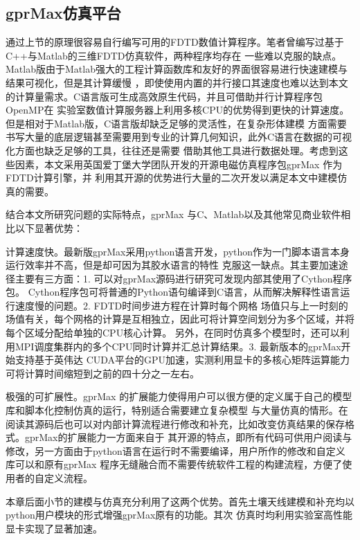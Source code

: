 \subsection{gprMax仿真平台}
通过上节的原理很容易自行编写可用的FDTD数值计算程序。笔者曾编写过基于C++与Matlab的三维FDTD仿真软件，两种程序均存在
一些难以克服的缺点。Matlab版由于Matlab强大的工程计算函数库和友好的界面很容易进行快速建模与结果可视化，但是其计算缓慢
，即使使用内置的并行接口其速度也难以达到本文的计算量需求。C语言版可生成高效原生代码，并且可借助并行计算程序包OpenMP在
实验室数值计算服务器上利用多核CPU的优势得到更快的计算速度。但是相对于Matlab版，C语言版却缺乏足够的灵活性，在复杂形体建模
方面需要书写大量的底层逻辑甚至需要用到专业的计算几何知识，此外C语言在数据的可视化方面也缺乏足够的工具，往往还是需要
借助其他工具进行数据处理。考虑到这些因素，本文采用英国爱丁堡大学团队开发的开源电磁仿真程序包gprMax
作为FDTD计算引擎，并
利用其开源的优势进行大量的二次开发以满足本文中建模仿真的需要。

结合本文所研究问题的实际特点，gprMax 与C、Matlab以及其他常见商业软件相比以下显著优势：

计算速度快。最新版gprMax采用python语言开发，python作为一门脚本语言本身运行效率并不高，但是却可因为其胶水语言的特性
克服这一缺点。其主要加速途径主要有三方面：1. 可以对gprMax源码进行研究可发现内部其使用了Cython程序包。
Cython程序包可将普通的Python语句编译到C语言，从而解决解释性语言运行速度慢的问题。2. FDTD时间步进方程在计算时每个网格
场值只与上一时刻的场值有关，每个网格的计算是互相独立，因此可将计算空间划分为多个区域，并将每个区域分配给单独的CPU核心计算。
另外，在同时仿真多个模型时，还可以利用MPI调度集群内的多个CPU同时计算并汇总计算结果。3. 最新版本的gprMax开始支持基于英伟达
CUDA平台的GPU加速，实测利用显卡的多核心矩阵运算能力可将计算时间缩短到之前的四十分之一左右。

极强的可扩展性。gprMax 的扩展能力使得用户可以很方便的定义属于自己的模型库和脚本化控制仿真的运行，特别适合需要建立复杂模型
与大量仿真的情形。在阅读其源码后也可以对内部计算流程进行修改和补充，比如改变仿真结果的保存格式。gprMax的扩展能力一方面来自于
其开源的特点，即所有代码可供用户阅读与修改，另一方面由于python语言在运行时不需要编译，用户所作的修改和自定义库可以和原有gprMax
程序无缝融合而不需要传统软件工程的构建流程，方便了使用者的自定义流程。

本章后面小节的建模与仿真充分利用了这两个优势。首先土壤天线建模和补充均以python用户模块的形式增强gprMax原有的功能。其次
仿真时均利用实验室高性能显卡实现了显著加速。

